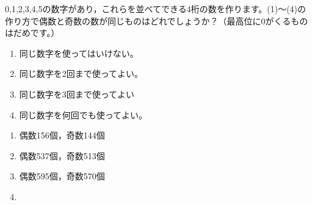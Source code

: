 \documentclass[b5paper]{jlreq}  %
\begin{document}
\begin{tcolorbox}[title=作られる偶数・奇数の割合 ,width=10cm,fonttitle=\gtfamily\sffamily\bfseries,colframe=black!50,colback=black!3]
0,1,2,3,4,5の数字があり，これらを並べてできる4桁の数を作ります。(1)〜(4)の作り方で偶数と奇数の数が同じものはどれでしょうか？（最高位に0がくるものはだめです。）
\begin{enumerate}[(1)]
    \item 同じ数字を使ってはいけない。
    \item 同じ数字を2回まで使ってよい。
    \item 同じ数字を3回まで使ってよい
    \item 同じ数字を何回でも使ってよい。
\end{enumerate}

\end{tcolorbox}

\begin{enumerate}[(1)]
    \item 偶数156個，奇数144個
    \item 偶数537個，奇数513個
    \item 偶数595個，奇数570個
    \item 
\end{enumerate}
\end{document}
